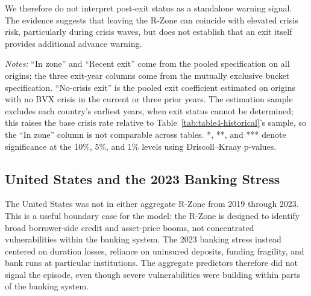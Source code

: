 \documentclass[11pt]{article}
\begin{document}
We therefore do not interpret post-exit status as a standalone warning
signal. The evidence suggests that leaving the R-Zone can coincide with
elevated crisis risk, particularly during crisis waves, but does not
establish that an exit itself provides additional advance warning.

\begin{table}[H]
\centering
\caption{\textbf{Crisis risk after leaving the R-Zone.} Coefficients are
percentage-point differences in crisis probability relative to country-years
outside the zone with no recent exit. The three exit columns separate years
one, two, and three years after leaving the zone. The final column estimates
the pooled exit effect after excluding origins with a BVX crisis in the
current or three prior years. The results differ by sector: business exits
show no clear increase in subsequent crisis risk, while household exits are
associated with higher risk, especially in the second and third years after
exit. The household estimates remain positive in the no-recent-crisis sample
but are mostly not statistically significant, so the evidence does not
establish exit as a standalone warning signal.}
\label{tab:rzone-exit}
\small


\medskip
\footnotesize
\textit{Notes:} ``In zone'' and ``Recent exit'' come from the pooled
specification on all origins; the three exit-year columns come from the
mutually exclusive bucket specification. ``No-crisis exit'' is the pooled
exit coefficient estimated on origins with no BVX crisis in the current or
three prior years. The estimation sample excludes each country's earliest
years, when exit status cannot be determined; this raises the base crisis
rate relative to Table~\ref{tab:table4-historical}'s sample, so the ``In
zone'' column is not comparable across tables. *, **, and *** denote
significance at the 10\%, 5\%, and 1\% levels using Driscoll--Kraay
p-values.
\end{table}

\subsection{United States and the 2023 Banking Stress}

The United States was not in either aggregate R-Zone from 2019 through 2023.
This is a useful boundary case for the model: the R-Zone is designed to
identify broad borrower-side credit and asset-price booms, not concentrated
vulnerabilities within the banking system. The 2023 banking stress instead
centered on duration losses, reliance on uninsured deposits, funding
fragility, and bank runs at particular institutions. The aggregate
predictors therefore did not signal the episode, even though severe
vulnerabilities were building within parts of the banking system.
\end{document}
